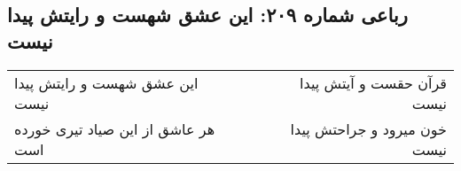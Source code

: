 \begin{center}
\section*{رباعی شماره ۲۰۹: این عشق شهست و رایتش پیدا نیست}
\label{sec:0209}
\begin{longtable}{l p{0.5cm} r}
این عشق شهست و رایتش پیدا نیست
&&
قرآن حقست و آیتش پیدا نیست
\\
هر عاشق از این صیاد تیری خورده است
&&
خون میرود و جراحتش پیدا نیست
\\
\end{longtable}
\end{center}
